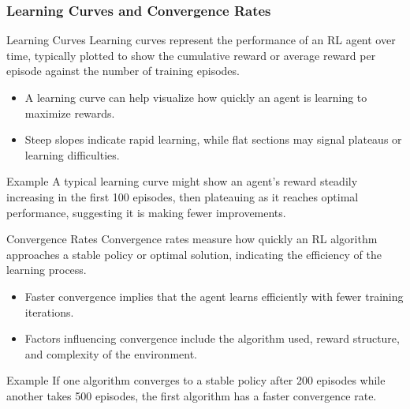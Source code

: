 \documentclass{beamer}
\begin{document}
\begin{frame}[fragile]
    \frametitle{Learning Curves and Convergence Rates}
    
    \begin{block}{Learning Curves}
        Learning curves represent the performance of an RL agent over time, typically plotted to show the cumulative reward or average reward per episode against the number of training episodes.
        
        \begin{itemize}
            \item A learning curve can help visualize how quickly an agent is learning to maximize rewards.
            \item Steep slopes indicate rapid learning, while flat sections may signal plateaus or learning difficulties.
        \end{itemize}
        
        \begin{block}{Example}
            A typical learning curve might show an agent's reward steadily increasing in the first 100 episodes, then plateauing as it reaches optimal performance, suggesting it is making fewer improvements.
        \end{block}
    \end{block}

    \begin{block}{Convergence Rates}
        Convergence rates measure how quickly an RL algorithm approaches a stable policy or optimal solution, indicating the efficiency of the learning process.

        \begin{itemize}
            \item Faster convergence implies that the agent learns efficiently with fewer training iterations.
            \item Factors influencing convergence include the algorithm used, reward structure, and complexity of the environment.
        \end{itemize}
        
        \begin{block}{Example}
            If one algorithm converges to a stable policy after 200 episodes while another takes 500 episodes, the first algorithm has a faster convergence rate.
        \end{block}
    \end{block}
\end{frame}
\end{document}
